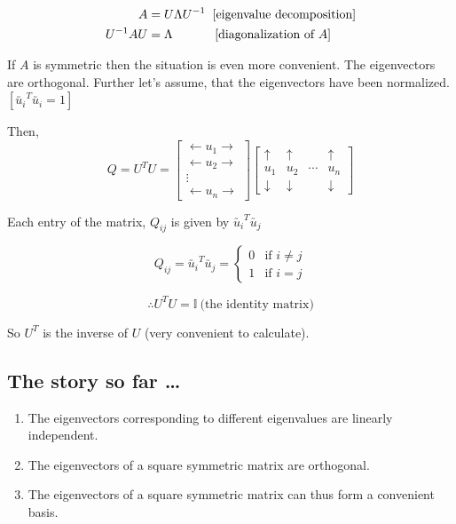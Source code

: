 \documentclass[11pt, a4paper]{article}
\begin{document}
\begin{align*}
A &= U \Lambda U^{-1} \hspace{0.2cm} \text{[eigenvalue decomposition]} \\
U^{-1} A U &= \Lambda \hspace{1.2cm} \text{[diagonalization of } A]
\end{align*}

\newpage

If $A$ is symmetric then the situation is even more convenient. The eigenvectors are orthogonal. Further let's assume, that the eigenvectors have been normalized. $\left[ \utilde{u_i}^T \utilde{u_i} = 1 \right]$

Then,
\[
Q = U^T U =
\begin{bmatrix}
\leftarrow u_1 \rightarrow \\
\leftarrow u_2 \rightarrow \\
\vdots \\
\leftarrow u_n \rightarrow
\end{bmatrix}
\begin{bmatrix}
\uparrow & \uparrow & & \uparrow \\
u_1 & u_2 & \cdots & u_n \\
\downarrow & \downarrow & & \downarrow
\end{bmatrix}
\]

Each entry of the matrix, $Q_{ij}$ is given by $\utilde{u_i}^T \utilde{u_j}$

\[
Q_{ij} = \utilde{u_i}^T \utilde{u_j} =
\begin{cases}
0 & \text{if } i \neq j \\
1 & \text{if } i = j
\end{cases}
\]

\[
\therefore U^T U = \mathbb{I} \ \text{(the identity matrix)}
\]

So $U^T$ is the inverse of $U$ (very convenient to calculate).

\subsection{The story so far \ldots}

\begin{enumerate}[$\bullet$]

\item The eigenvectors corresponding to different eigenvalues are linearly independent.

\item The eigenvectors of a square symmetric matrix are orthogonal.

\item The eigenvectors of a square symmetric matrix can thus form a convenient basis.

\end{enumerate}
\end{document}
